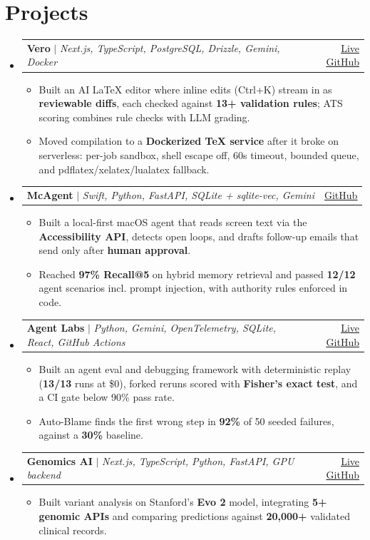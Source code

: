 \documentclass[letterpaper,11pt]{article}
\makeatletter
\newcommand{\resumeItem}[1]{\item\small{{#1 \vspace{-2pt}}}}
\newcommand{\resumeProjectHeading}[2]{
    \item
    \begin{tabular*}{0.97\textwidth}{l@{\extracolsep{\fill}}r}
      \small#1 & #2 \\
    \end{tabular*}\vspace{-7pt}}
\newcommand{\resumeSubHeadingListStart}{\begin{itemize}[leftmargin=0.15in, label={}]}
\newcommand{\resumeSubHeadingListEnd}{\end{itemize}}
\newcommand{\resumeItemListStart}{\begin{itemize}}
\newcommand{\resumeItemListEnd}{\end{itemize}\vspace{-5pt}}
\makeatother
\begin{document}
\section{Projects}
    \resumeSubHeadingListStart
      \resumeProjectHeading
          {\textbf{Vero} $|$ \emph{Next.js, TypeScript, PostgreSQL, Drizzle, Gemini, Docker}}{\href{https://withvero.app}{\underline{Live}} \href{https://github.com/sehajmakkar/Vero}{\underline{GitHub}}}
          \resumeItemListStart
            \resumeItem{Built an AI LaTeX editor where inline edits (Ctrl+K) stream in as \textbf{reviewable diffs}, each checked against \textbf{13+ validation rules}; ATS scoring combines rule checks with LLM grading.}
            \resumeItem{Moved compilation to a \textbf{Dockerized TeX service} after it broke on serverless: per-job sandbox, shell escape off, 60s timeout, bounded queue, and pdflatex/xelatex/lualatex fallback.}
          \resumeItemListEnd
      \resumeProjectHeading
          {\textbf{McAgent} $|$ \emph{Swift, Python, FastAPI, SQLite + sqlite-vec, Gemini}}{\href{https://github.com/sehajmakkar/contextagent}{\underline{GitHub}}}
          \resumeItemListStart
            \resumeItem{Built a local-first macOS agent that reads screen text via the \textbf{Accessibility API}, detects open loops, and drafts follow-up emails that send only after \textbf{human approval}.}
            \resumeItem{Reached \textbf{97\% Recall@5} on hybrid memory retrieval and passed \textbf{12/12} agent scenarios incl. prompt injection, with authority rules enforced in code.}
          \resumeItemListEnd
      \resumeProjectHeading
          {\textbf{Agent Labs} $|$ \emph{Python, Gemini, OpenTelemetry, SQLite, React, GitHub Actions}}{\href{https://agent-labs-chi.vercel.app}{\underline{Live}} \href{https://github.com/sehajmakkar/agent-labs}{\underline{GitHub}}}
          \resumeItemListStart
            \resumeItem{Built an agent eval and debugging framework with deterministic replay (\textbf{13/13} runs at \$0), forked reruns scored with \textbf{Fisher's exact test}, and a CI gate below 90\% pass rate.}
            \resumeItem{Auto-Blame finds the first wrong step in \textbf{92\%} of 50 seeded failures, against a \textbf{30\%} baseline.}
          \resumeItemListEnd
      \resumeProjectHeading
          {\textbf{Genomics AI} $|$ \emph{Next.js, TypeScript, Python, FastAPI, GPU backend}}{\href{https://genomics-ai.vercel.app/}{\underline{Live}} \href{https://github.com/sehajmakkar/GenomicsAI}{\underline{GitHub}}}
          \resumeItemListStart
            \resumeItem{Built variant analysis on Stanford's \textbf{Evo 2} model, integrating \textbf{5+ genomic APIs} and comparing predictions against \textbf{20,000+} validated clinical records.}
          \resumeItemListEnd
    \resumeSubHeadingListEnd
\end{document}
